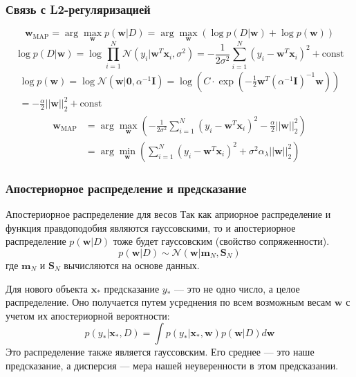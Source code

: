 \documentclass[notheorems, handout]{beamer}
\newcommand{\vect}[1]{\mathbf{#1}}
\newcommand{\matr}[1]{\boldsymbol{#1}}
\begin{document}
\begin{frame}
  \frametitle{Связь с L2-регуляризацией}
  $$ \mathbf{w}_{\text{MAP}} = \arg\max_{\mathbf{w}} p(\mathbf{w}|D) = \arg\max_{\mathbf{w}} \left( \log p(D|\mathbf{w}) + \log p(\mathbf{w}) \right) $$
\[
    \log p(D|\mathbf{w}) = \log \prod_{i=1}^N \mathcal{N}(y_i|\mathbf{w}^T\mathbf{x}_i, \sigma^2) = -\frac{1}{2\sigma^2} \sum_{i=1}^N (y_i - \mathbf{w}^T\mathbf{x}_i)^2 + \text{const}
\]
\begin{multline*}   \log p(\mathbf{w}) = \log \mathcal{N}(\mathbf{w}|\mathbf{0}, \alpha^{-1}\mathbf{I})  = \log \left( C \cdot \exp\left(-\frac{1}{2}\mathbf{w}^T(\alpha^{-1}\mathbf{I})^{-1}\mathbf{w}\right) \right) \\
    =  -\frac{\alpha}{2} ||\mathbf{w}||_2^2 + \text{const}
\end{multline*}
\begin{align*}
   \mathbf{w}_{\text{MAP}} &= \arg\max_{\mathbf{w}} \left( -\frac{1}{2\sigma^2} \sum_{i=1}^N (y_i - \mathbf{w}^T\mathbf{x}_i)^2 - \frac{\alpha}{2} ||\mathbf{w}||_2^2 \right) \\
   &= \arg\min_{\mathbf{w}} \left( \sum_{i=1}^N (y_i - \mathbf{w}^T\mathbf{x}_i)^2 + \sigma^2\alpha_{\lambda} ||\mathbf{w}||_2^2 \right)
  \end{align*}

\end{frame}

\begin{frame}
  \frametitle{Апостериорное распределение и предсказание}
  \begin{block}{Апостериорное распределение для весов}
    Так как априорное распределение и функция правдоподобия являются гауссовскими, то и апостериорное распределение $p(\vect{w}|D)$ тоже будет гауссовским (свойство сопряженности).
    $$ p(\vect{w}|D) \sim \mathcal{N}(\vect{w} | \vect{m}_N, \matr{S}_N) $$
    где $\vect{m}_N$ и $\matr{S}_N$ вычисляются на основе данных.
  \end{block}
  
    Для нового объекта $\vect{x}_*$ предсказание $y_*$ --- это не одно число, а целое распределение. Оно получается путем усреднения по всем возможным весам $\vect{w}$ с учетом их апостериорной вероятности:
    \[ p(y_*|\vect{x}_*, D) = \int p(y_*|\vect{x}_*, \vect{w}) p(\vect{w}|D) d\vect{w} \]
    Это распределение также является гауссовским. Его среднее --- это наше предсказание, а дисперсия --- мера нашей неуверенности в этом предсказании.
\end{frame}
\end{document}

